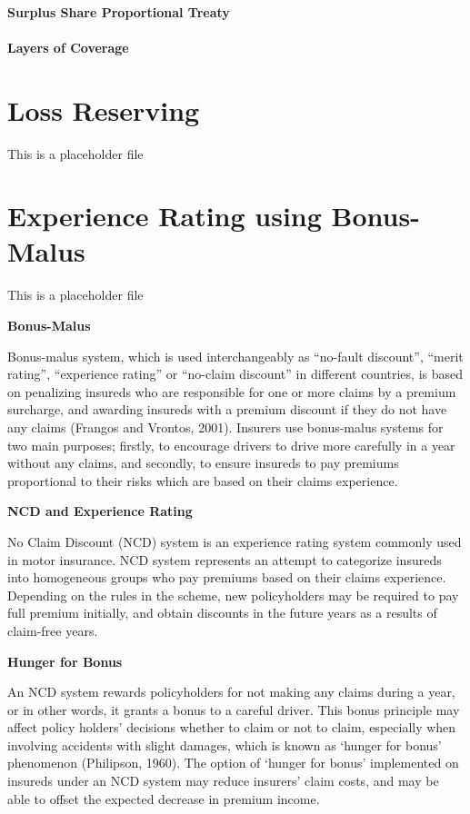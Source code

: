 \documentclass[]{book}
\theoremstyle{definition}
\theoremstyle{definition}
\theoremstyle{definition}
\theoremstyle{remark}
\begin{document}
\subsubsection{Surplus Share Proportional
Treaty}\label{surplus-share-proportional-treaty}

\subsubsection{Layers of Coverage}\label{layers-of-coverage}

\chapter{Loss Reserving}\label{C:LossReserves}

This is a placeholder file

\chapter{Experience Rating using Bonus-Malus}\label{C:BonusMalus}

This is a placeholder file

\textbf{Bonus-Malus}

Bonus-malus system, which is used interchangeably as ``no-fault
discount'', ``merit rating'', ``experience rating'' or ``no-claim
discount'' in different countries, is based on penalizing insureds who
are responsible for one or more claims by a premium surcharge, and
awarding insureds with a premium discount if they do not have any claims
(Frangos and Vrontos, 2001). Insurers use bonus-malus systems for two
main purposes; firstly, to encourage drivers to drive more carefully in
a year without any claims, and secondly, to ensure insureds to pay
premiums proportional to their risks which are based on their claims
experience.

\textbf{NCD and Experience Rating}

No Claim Discount (NCD) system is an experience rating system commonly
used in motor insurance. NCD system represents an attempt to categorize
insureds into homogeneous groups who pay premiums based on their claims
experience. Depending on the rules in the scheme, new policyholders may
be required to pay full premium initially, and obtain discounts in the
future years as a results of claim-free years.

\textbf{Hunger for Bonus }

An NCD system rewards policyholders for not making any claims during a
year, or in other words, it grants a bonus to a careful driver. This
bonus principle may affect policy holders' decisions whether to claim or
not to claim, especially when involving accidents with slight damages,
which is known as `hunger for bonus' phenomenon (Philipson, 1960). The
option of `hunger for bonus' implemented on insureds under an NCD system
may reduce insurers' claim costs, and may be able to offset the expected
decrease in premium income.
\end{document}
